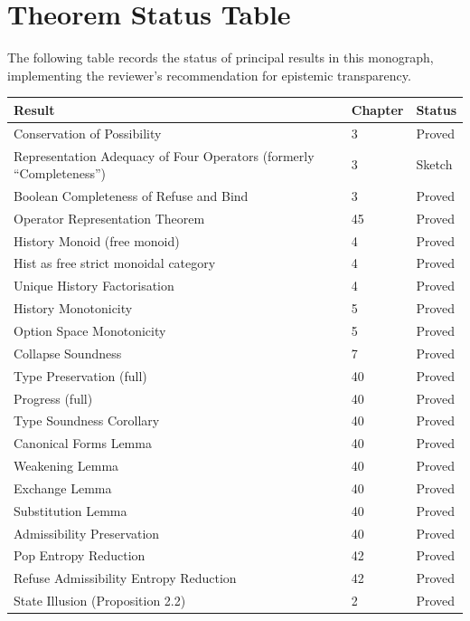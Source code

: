 \documentclass[12pt, a4paper, openany]{book}
\theoremstyle{plain}
\theoremstyle{definition}
\theoremstyle{remark}
\begin{document}
\chapter*{Theorem Status Table}

The following table records the status of principal results in this monograph,
implementing the reviewer's recommendation for epistemic transparency.

\begin{center}
\renewcommand{\arraystretch}{1.15}
\begin{longtable}{lll}
\toprule
Result & Chapter & Status \\
\midrule
Conservation of Possibility & 3 & Proved \\
Representation Adequacy of Four Operators (formerly ``Completeness'') & 3 & Sketch \\
Boolean Completeness of Refuse and Bind & 3 & Proved \\
Operator Representation Theorem & 45 & Proved \\
History Monoid (free monoid) & 4 & Proved \\
Hist as free strict monoidal category & 4 & Proved \\
Unique History Factorisation & 4 & Proved \\
History Monotonicity & 5 & Proved \\
Option Space Monotonicity & 5 & Proved \\
Collapse Soundness & 7 & Proved \\
Type Preservation (full) & 40 & Proved \\
Progress (full) & 40 & Proved \\
Type Soundness Corollary & 40 & Proved \\
Canonical Forms Lemma & 40 & Proved \\
Weakening Lemma & 40 & Proved \\
Exchange Lemma & 40 & Proved \\
Substitution Lemma & 40 & Proved \\
Admissibility Preservation & 40 & Proved \\
Pop Entropy Reduction & 42 & Proved \\
Refuse Admissibility Entropy Reduction & 42 & Proved \\
State Illusion (Proposition 2.2) & 2 & Proved \\

\end{longtable}
\end{center}
\end{document}

